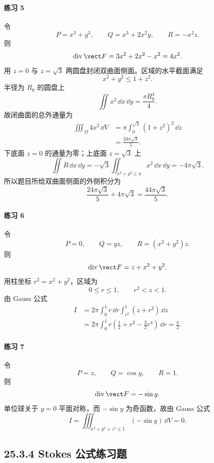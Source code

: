 \paragraph{练习 5}
\begin{xsolution}
令
\[
P=x^3+y^3,\qquad Q=x^3+2x^2y,\qquad R=-x^2z.
\]
则
\[
  \operatorname{div}\vect F=3x^2+2x^2-x^2=4x^2.
\]
用 $z=0$ 与 $z=\sqrt3$ 两圆盘封闭双曲面侧面。区域的水平截面满足
\[
  x^2+y^2\le1+z^2.
\]
半径为 $R_0$ 的圆盘上
\[
  \iint x^2\,\dd x\,\dd y=\frac{\pi R_0^4}{4}.
\]
故闭曲面的总外通量为
\begin{align*}
\iiint_\Omega4x^2\,\dd V
&=\pi\int_0^{\sqrt3}(1+z^2)^2\,\dd z\\
&=\frac{24\pi\sqrt3}{5}.
\end{align*}
下底面 $z=0$ 的通量为零；上底面 $z=\sqrt3$ 上
\[
  \iint R\,\dd x\,\dd y
  =-\sqrt3\iint_{x^2+y^2\le4}x^2\,\dd x\,\dd y
  =-4\pi\sqrt3.
\]
所以题目所给双曲面侧面的外侧积分为
\[
  \boxed{\frac{24\pi\sqrt3}{5}+4\pi\sqrt3
  =\frac{44\pi\sqrt3}{5}}.
\]
\end{xsolution}

\paragraph{练习 6}
\begin{xsolution}
令
\[
  P=0,\qquad Q=yz,\qquad R=(x^2+y^2)z.
\]
则
\[
  \operatorname{div}\vect F=z+x^2+y^2.
\]
用柱坐标 $r^2=x^2+y^2$，区域为
\[
  0\le r\le1,\qquad r^2<z<1.
\]
由 Gauss 公式
\begin{align*}
I
&=2\pi\int_0^1r\,\dd r\int_{r^2}^{1}(z+r^2)\,\dd z\\
&=2\pi\int_0^1r\left(\frac12+r^2-\frac32r^4\right)\,\dd r
=\frac\pi2.
\end{align*}
\end{xsolution}

\paragraph{练习 7}
\begin{xsolution}
令
\[
  P=z,\qquad Q=\cos y,\qquad R=1.
\]
则
\[
  \operatorname{div}\vect F=-\sin y.
\]
单位球关于 $y=0$ 平面对称，而 $-\sin y$ 为奇函数，故由 Gauss 公式
\[
  \boxed{I=\iiint_{x^2+y^2+z^2\le1}(-\sin y)\,\dd V=0}.
\]
\end{xsolution}

\subsection*{25.3.4 Stokes 公式练习题}

